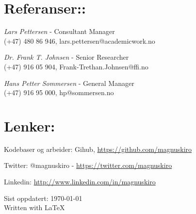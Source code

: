 \documentclass[letterpaper]{article}
\def\footerlink{}
\renewenvironment{itemize}{
  \begin{list}{}{
    \setlength{\leftmargin}{1.5em}
  }
}{
  \end{list}
}
\begin{document}
\section*{Referanser::}
\begin{itemize}
    \item[Academic Work :] \textit{Lars Pettersen} - Consultant Manager 
	\\(+47) 480 86 946, lars.pettersen@academicwork.no

    \item[FFI :] \textit{Dr. Frank T. Johnsen} - Senior Researcher
	\\(+47) 916 05 904, Frank-Trethan.Johnsen@ffi.no

    \item[iNic :] \textit{Hans Petter Sommersen} - General Manager
	\\(+47) 916 95 000, hp@sommersen.no

\end{itemize}


\section*{Lenker:}
\begin{itemize}
	\item Kodebaser og arbeider: Gihub, \url{https://github.com/magnuskiro}
	\item Twitter: @magnuskiro - \url{https://twitter.com/magnuskiro}
	\item Linkedin: \url{http://www.linkedin.com/in/magnuskiro}
\end{itemize}


\bigskip

\begin{center}
  \begin{footnotesize}
    Sist oppdatert: \today \\
    \href{\footerlink}{\texttt{\footerlink}} Written with \LaTeX
  \end{footnotesize}
\end{center}
\end{document}
